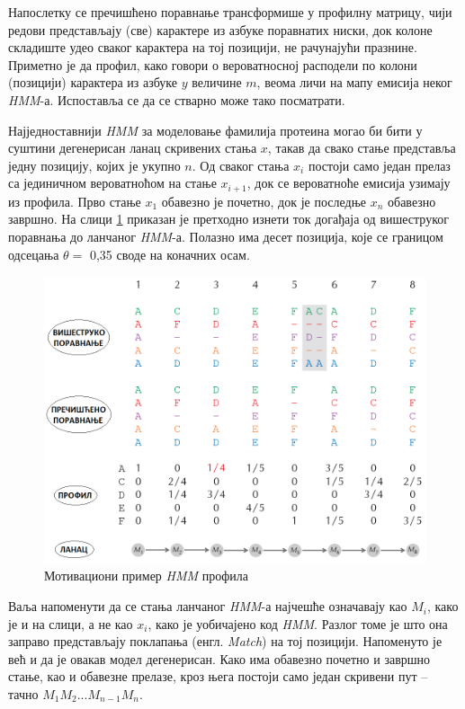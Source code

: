 \documentclass[12pt,oneside]{memoir}
\begin{document}
\begin{CJK}{UTF8}{ipxm}
Напослетку се пречишћено поравнање трансформише у профилну матрицу, чији редови представљају (све) карактере из азбуке поравнатих ниски, док колоне складиште удео сваког карактера на тој позицији, не рачунајући празнине. Приметно је да профил, како говори о вероватносној расподели по колони (позицији) карактера из азбуке $y$ величине $m$, веома личи на мапу емисија неког \textit{HMM}-а. Испоставља се да се стварно може тако посматрати.

Најједноставнији \textit{HMM} за моделовање фамилија протеина могао би бити у суштини дегенерисан ланац скривених стања $x$, такав да свако стање представља једну позицију, којих је укупно $n$. Од сваког стања $x_i$ постоји само један прелаз са јединичном вероватноћом на стање $x_{i+1}$, док се вероватноће емисија узимају из профила. Прво стање $x_1$ обавезно је почетно, док је последње $x_n$ обавезно завршно. На слици \ref{fig:profil} приказан је претходно изнети ток догађаја од вишеструког поравнања до ланчаног \textit{HMM}-а. Полазно има десет позиција, које се границом одсецања $\theta =$ 0,35 своде на коначних осам.

\begin{figure}[H]
  \centering
  \includegraphics[width=\textwidth]{profil.png}
  \caption{Мотивациони пример \textit{HMM} профила \cite{compeau2015}}
  \label{fig:profil}
\end{figure}

Ваља напоменути да се стања ланчаног \textit{HMM}-а најчешће означавају као $M_i$, како је и на слици, а не као $x_i$, како је уобичајено код \textit{HMM}. Разлог томе је што она заправо представљају поклапања (енгл. \textit{Match}) на тој позицији. Напоменуто је већ и да је овакав модел дегенерисан. Како има обавезно почетно и завршно стање, као и обавезне прелазе, кроз њега постоји само један скривени пут -- тачно $M_1M_2...M_{n-1}M_n$.


\end{CJK}
\end{document}
